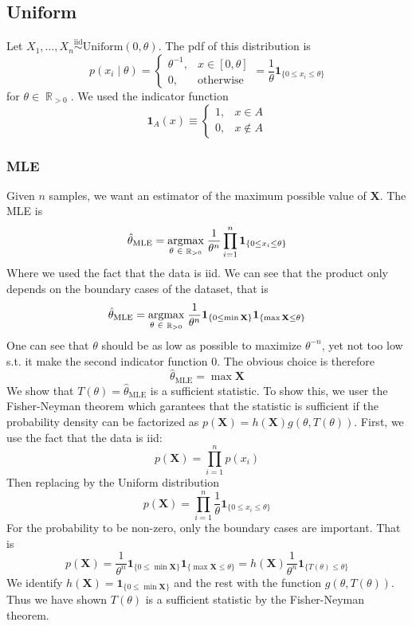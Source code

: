 \documentclass{article}
\DeclareMathOperator{\R}{\mathbb{R}}
\newcommand{\s}{\hspace{0.1cm}}
\numberwithin{equation}{section}
\newcommand{\mle}[1]{\hat{#1}_{\text{MLE}}}
\newcommand{\set}[1]{\{#1\}}
\begin{document}
\subsection{Uniform}
Let $X_1,\dots,X_n \overset{\text{iid}}{\sim }\text{Uniform}(0,\theta) $. The pdf 
of this distribution is 
\[
        p(x_i \mid \theta) = \left\{  
        \begin{array}{rl}
                \theta^{-1},& x \in [0,\theta]\\
                0,& \text{otherwise} 
        \end{array}
\right. 
= \frac{1}{\theta} \bm{ 1}_{\{0 \le x_i \le \theta \}} 
\]
for $\theta \in \R_{>0}$. We used the indicator function 
\[
        \bm{ 1}_A(x) \equiv \left\{ 
        \begin{array}{lr}
                1,& x \in A \\
                0,& x \not\in A
        \end{array}
        \right. 
\]



\subsubsection{MLE}
Given $n$ samples, we want an estimator of the maximum possible value of $\mathbf{X}$.
The MLE is
\[
        \mle{\theta} = \underset{\theta \s \in \s \R_{>0}}{\text{argmax}}
        \s
        \frac{1}{\theta^n}\prod_{i = 1}^n \bm{ 1}_{\set{0 \le x_i \le \theta}} 
\]
Where we used the fact that the data is iid. We can see that the product only depends 
on the boundary cases of the dataset, that is
\[
        \mle{\theta} = \underset{\theta \s \in \s \R_{>0}}{\text{argmax}}
        \s
        \frac{1}{\theta^n}  \bm{ 1}_{\set{0 \le \min \mathbf{X}}} 
        \bm{ 1}_{\set{\max \mathbf{X} \le \theta}}  
\]
One can see that $\theta$ should be as low as possible to maximize $\theta^{-n}$, yet 
not too low s.t. it make the second indicator function 0. The obvious choice is therefore 
\[
        \boxed{\mle{\theta} = \max \mathbf{X}}
\]
We show that $T(\theta) = \mle{\theta}$ is a sufficient statistic.
To show this, we user the Fisher-Neyman theorem which garantees that the 
statistic is sufficient if
the probability density can be factorized as 
$p(\mathbf{X}) = h(\mathbf{X}) g(\theta, T(\theta))$. First, we use 
the fact that the data is iid:
\[
        p(\mathbf{X}) = \prod_{i = 1}^n p(x_i)
\]
Then replacing by the Uniform distribution
\[
        p(\mathbf{X}) = \prod_{i = 1}^n \frac{1}{\theta}\bm{ 1}_{\{0 \le x_i \le \theta\}} 
\]
For the probability to be non-zero, only the boundary cases are important. That is
\[
p(\mathbf{X}) = \frac{1}{\theta^n} 
\bm{ 1}_{\{0 \le \min \mathbf{X} \}} 
\bm{ 1}_{\{\max \mathbf{X}\le \theta\}} 
= h(\mathbf{X}) \frac{1}{\theta^n} \bm{ 1}_{\{T(\theta) \le \theta\}} 
\]
We identify $h(\mathbf{X}) = \bm{ 1}_{\{0 \le \min\mathbf{X}\}} $ and the rest with the 
function $g(\theta, T(\theta))$. Thus we have shown  $T(\theta)$ is a 
sufficient statistic by the Fisher-Neyman theorem.
\end{document}
